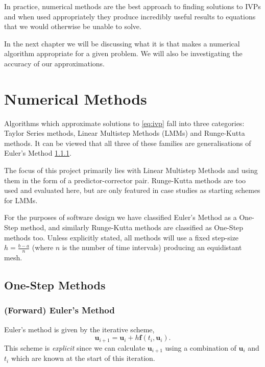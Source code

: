 \documentclass[12pt, twoside]{report}
\theoremstyle{plain}
\theoremstyle{definition}
\begin{document}
        In practice, numerical methods are the best approach to finding 
        solutions to IVPs and when used appropriately they produce incredibly 
        useful results to equations that we would otherwise be unable to solve.

        In the next chapter we will be discussing what it is that makes a 
        numerical algorithm appropriate for a given problem. We will also be
        investigating the accuracy of our approximations.



\chapter{Numerical Methods}

    Algorithms which approximate solutions to \eqref{eq:ivp} fall into three
    categories: Taylor Series methods, Linear Multistep Methods (LMMs) and 
    Runge-Kutta methods. It can be viewed that all three of these families are
    generalisations of Euler's Method \ref{2_forward_euler}. 

    The focus of this project primarily lies with Linear Multistep Methods and 
    using them in the form of a predictor-corrector pair. Runge-Kutta methods
    are too used and evaluated here, but are only featured in case studies
    as starting schemes for LMMs.

    For the purposes of software design we have classified Euler's Method as a
    One-Step method, and similarly Runge-Kutta methods are classified as 
    One-Step methods too. Unless explicitly stated, all methods will use a 
    fixed step-size $h=\frac{b-a}{n}$ (where $n$ is the number of time 
    intervals) producing an equidistant mesh.

    \section{One-Step Methods}
    \label{2_onestep}
        
        \subsection{(Forward) Euler's Method}
        \label{2_forward_euler}
            Euler's method is given by the iterative scheme,
            \begin{equation}
            \label{eq:euler}
                \mathbf{u}_{i+1} = \mathbf{u}_i + h\mathbf{f}(t_i, 
                \mathbf{u}_i).
            \end{equation}
            This scheme is \textit{explicit} since we can calculate 
            $\mathbf{u}_{i+1}$ using a combination of $\mathbf{u}_i$ and $t_i$
            which are known at the start of this iteration.
\end{document}
